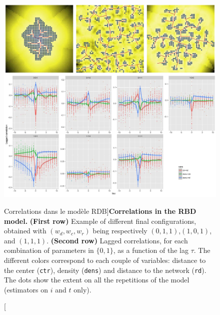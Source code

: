 \begin{figure}
\includegraphics[width=\linewidth]{Figures/Final/4-2-2-fig-causalityregimes-exrdb.jpg}
\caption[Correlation in the RBD model][Correlations dans le modèle RDB]{\textbf{Correlations in the RBD model.} \textbf{(First row)} Example of different final configurations, obtained with $(w_{d},w_{c},w_{r})$ being respectively $(0,1,1)$,$(1,0,1)$, and $(1,1,1)$. \textbf{(Second row)} Lagged correlations, for each combination of parameters in $\{0,1\}$, as a function of the lag $\tau$. The different colors correspond to each couple of variables: distance to the center (\texttt{ctr}), density (\texttt{dens}) and distance to the network (\texttt{rd}). The dots show the extent on all the repetitions of the model (estimators on $i$ and $t$ only).\label{fig:causalityregimes:exrdb}}


\end{figure}
